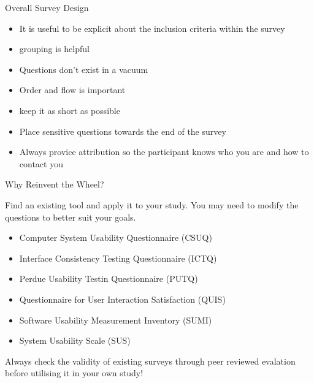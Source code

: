 \documentclass[ignorenonframetext,]{beamer}
\providecommand{\tightlist}{%
  \setlength{\itemsep}{0pt}\setlength{\parskip}{0pt}}
\begin{document}
\begin{frame}{Overall Survey Design}

\begin{itemize}
\tightlist
\item
  It is useful to be explicit about the inclusion criteria within the
  survey
\item
  grouping is helpful
\item
  Questions don't exist in a vacuum
\item
  Order and flow is important
\item
  keep it as short as possible
\item
  Place sensitive questions towards the end of the survey
\item
  Always provice attribution so the participant knows who you are and
  how to contact you
\end{itemize}

\end{frame}

\begin{frame}{Why Reinvent the Wheel?}

Find an existing tool and apply it to your study. You may need to modify
the questions to better suit your goals.

\begin{itemize}
\tightlist
\item
  Computer System Usability Questionnaire (CSUQ)
\item
  Interface Consistency Testing Questionnaire (ICTQ)
\item
  Perdue Usability Testin Questionnaire (PUTQ)
\item
  Questionnaire for User Interaction Satisfaction (QUIS)
\item
  Software Usability Measurement Inventory (SUMI)
\item
  System Usability Scale (SUS)
\end{itemize}

Always check the validity of existing surveys through peer reviewed
evalation before utilising it in your own study!

\end{frame}
\end{document}
